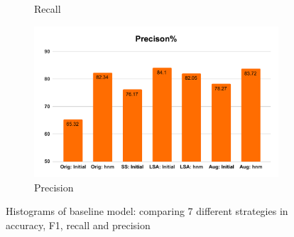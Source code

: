 \begin{figure}[!htb]
\begin{subfigure}[b]{0.5\linewidth}
          \caption{Recall}
     \end{subfigure}
     \begin{subfigure}[b]{0.5\linewidth}
         \centering
          \includegraphics[scale=0.35]{Figs/chap4/basepre.pdf}
          \caption{Precision}
     \end{subfigure}
  \caption{Histograms of baseline model: comparing 7 different strategies in accuracy, F1, recall and precision}
  \label{Fig:hist}
\end{figure}
